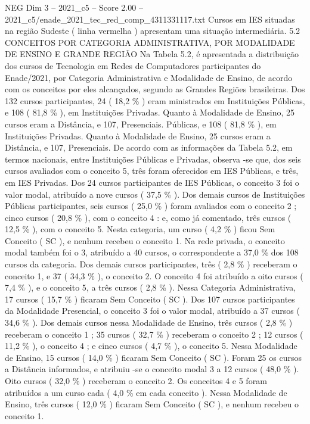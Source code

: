 \begin{textsample}{NEG Dim 3 – 2021\_c5 – Score 2.00 – 2021\_c5/enade\_2021\_tec\_red\_comp\_4311331117.txt}
Cursos em IES situadas na região Sudeste ( linha vermelha ) apresentam uma situação intermediária. 5.2 CONCEITOS POR CATEGORIA ADMINISTRATIVA, POR MODALIDADE DE ENSINO E GRANDE REGIÃO Na Tabela 5.2, é apresentada a distribuição dos cursos de Tecnologia em Redes de Computadores participantes do Enade/2021, por Categoria Administrativa e Modalidade de Ensino, de acordo com os conceitos por eles alcançados, segundo as Grandes Regiões brasileiras.
Dos 132 cursos participantes, 24 ( 18,2 \% ) eram ministrados em Instituições Públicas, e 108 ( 81,8 \% ), em Instituições Privadas.
Quanto à Modalidade de Ensino, 25 cursos eram a Distância, e 107, Presenciais.
Públicas, e 108 ( 81,8 \% ), em Instituições Privadas.
Quanto à Modalidade de Ensino, 25 cursos eram a Distância, e 107, Presenciais.
De acordo com as informações da Tabela 5.2, em termos nacionais, entre Instituições Públicas e Privadas, observa -se que, dos seis cursos avaliados com o conceito 5, três foram oferecidos em IES Públicas, e três, em IES Privadas.
Dos 24 cursos participantes de IES Públicas, o conceito 3 foi o valor modal, atribuído a nove cursos ( 37,5 \% ).
Dos demais cursos de Instituições Públicas participantes, seis cursos ( 25,0 \% ) foram avaliados com o conceito 2 ; cinco cursos ( 20,8 \% ), com o conceito 4 : e, como já comentado, três cursos ( 12,5 \% ), com o conceito 5.
Nesta categoria, um curso ( 4,2 \% ) ficou Sem Conceito ( SC ), e nenhum recebeu o conceito 1.
Na rede privada, o conceito modal também foi o 3, atribuído a 40 cursos, o correspondente a 37,0 \% dos 108 cursos da categoria.
Dos demais cursos participantes, três ( 2,8 \% ) receberam o conceito 1, e 37 ( 34,3 \% ), o conceito 2.
O conceito 4 foi atribuído a oito cursos ( 7,4 \% ), e o conceito 5, a três cursos ( 2,8 \% ).
Nessa Categoria Administrativa, 17 cursos ( 15,7 \% ) ficaram Sem Conceito ( SC ).
Dos 107 cursos participantes da Modalidade Presencial, o conceito 3 foi o valor modal, atribuído a 37 cursos ( 34,6 \% ).
Dos demais cursos nessa Modalidade de Ensino, três cursos ( 2,8 \% ) receberam o conceito 1 ; 35 cursos ( 32,7 \% ) receberam o conceito 2 ; 12 cursos ( 11,2 \% ), o conceito 4 ; e cinco cursos ( 4,7 \% ), o conceito 5.
Nessa Modalidade de Ensino, 15 cursos ( 14,0 \% ) ficaram Sem Conceito ( SC ).
Foram 25 os cursos a Distância informados, e atribuiu -se o conceito modal 3 a 12 cursos ( 48,0 \% ).
Oito cursos ( 32,0 \% ) receberam o conceito 2.
Os conceitos 4 e 5 foram atribuídos a um curso cada ( 4,0 \% em cada conceito ).
Nessa Modalidade de Ensino, três cursos ( 12,0 \% ) ficaram Sem Conceito ( SC ), e nenhum recebeu o conceito 1.

\end{textsample}
